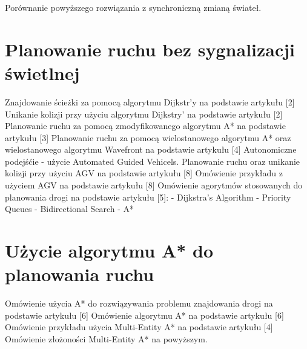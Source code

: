 Porównanie powyższego rozwiązania z synchroniczną zmianą świateł.
\newline
\newline

\section{Planowanie ruchu bez sygnalizacji świetlnej}

Znajdowanie ścieżki za pomocą algorytmu Dijkstr'y na podstawie artykułu [2]
\newline
\newline
Unikanie kolizji przy użyciu algorytmu Dijkstry' na podstawie artykułu [2]
\newline
\newline
Planowanie ruchu za pomocą zmodyfikowanego algorytmu A* na podstawie artykułu [3]
\newline
\newline
Planowanie ruchu za pomocą wielostanowego algorytmu A* oraz wielostanowego algorytmu Wavefront na podstawie artykułu [4]
\newline
\newline
Autonomiczne podejśćie - użycie Automated Guided Vehicels.
\newline
\newline
Planowanie ruchu oraz unikanie kolizji przy użyciu AGV na podstawie artykułu [8]
\newline
\newline
Omówienie przykładu z użyciem AGV na podstawie artykułu [8]
\newline
\newline
Omówienie agorytmów stosowanych do planowania drogi na podstawie artykułu [5]:
  \newline
  - Dijkstra's Algorithm
  \newline
  - Priority Queues
  \newline
  - Bidirectional Search
  \newline
  - A*
  \newline
\newline
\newline

\section{Użycie algorytmu A* do planowania ruchu}

Omówienie użycia A* do rozwiązywania problemu znajdowania drogi na podstawie artykułu [6]
\newline
\newline
Omówienie algorytmu A* na podstawie artykułu [6]
\newline
\newline
Omówienie przykładu użycia Multi-Entity A* na podstawie artykułu [4]
\newline
\newline
Omówienie złożoności Multi-Entity A* na powyższym.
\newline
\newline

